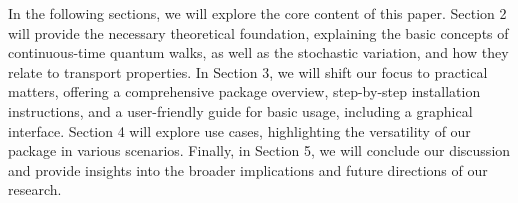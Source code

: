 \documentclass[main.tex]{subfiles}
\begin{document}
In the following sections, we will explore the core content of this paper.
Section 2 will provide the necessary theoretical foundation, explaining the
basic concepts of continuous-time quantum walks, as well as the stochastic
variation, and how they relate to transport properties. In Section 3, we will
shift our focus to practical matters, offering a comprehensive package
overview, step-by-step installation instructions, and a user-friendly guide for
basic usage, including a graphical interface. Section 4 will explore use cases,
highlighting the versatility of our package in various scenarios. Finally, in
Section 5, we will conclude our discussion and provide insights into the
broader implications and future directions of our research.
\end{document}

